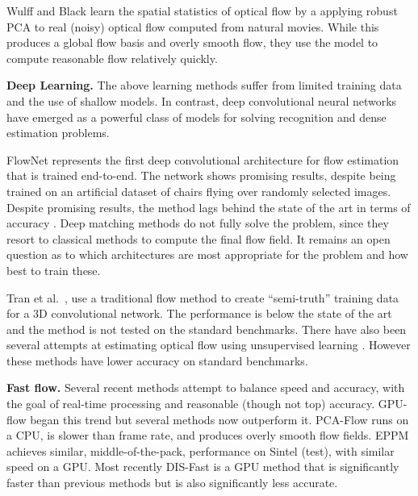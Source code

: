 \documentclass[10pt,twocolumn,letterpaper]{article}
\begin{document}
Wulff and Black \cite{wulff2015efficient} learn the spatial statistics of optical flow by a
applying robust PCA \cite{Hauberg:PAMI:2015} to real (noisy) optical flow computed from natural movies.
While this produces a global flow basis and overly smooth flow, 
they use the model to compute reasonable flow relatively quickly.






{\bf Deep Learning.} 
The above learning methods suffer from limited training data and the use of shallow models.
In contrast, deep convolutional neural networks have emerged as a powerful class of models for solving recognition \cite{he2015deep,szegedy2015going} and dense estimation \cite{chen2014semantic,long2015fully} problems. %


FlowNet \cite{dosovitskiy2015flownet} represents the first deep convolutional architecture for flow estimation that is trained end-to-end. 
The network shows promising results, despite being trained on an artificial dataset of chairs flying over randomly selected images.
Despite promising results, the method lags behind the state of the art in terms of accuracy \cite{dosovitskiy2015flownet}.  
Deep matching methods \cite{guney2016ACCV,epicflow,weinzaepfel2013deepflow,thewlis2016fully} do not fully solve the problem, since they resort to classical methods to compute the final flow field.
It remains an open question as to which architectures are most appropriate for the problem and how best to train these.



Tran et al.~\cite{Tran:End2End:2016}, use a traditional flow method to create ``semi-truth'' training data for a 3D convolutional network. 
The performance is below the state of the art and the method is not tested on the standard benchmarks.
There have also been several attempts at estimating optical flow using unsupervised learning \cite{ahmadi2016unsupervised,yu2016back}. 
However these methods have lower accuracy on standard benchmarks.







{\bf Fast flow.} Several recent methods attempt to balance speed and accuracy, with the goal of real-time processing and reasonable (though not top) accuracy.
GPU-flow \cite{Werlberger2009:GPUflow} began this trend but several methods now outperform it.
PCA-Flow \cite{wulff2015efficient} runs on a CPU, is slower than frame rate, and produces overly smooth flow fields.
EPPM \cite{bao2014tipeppm} achieves similar, middle-of-the-pack, performance on Sintel (test), with similar speed on a GPU.
Most recently DIS-Fast \cite{Kroeger:ECCV:2016} is a GPU method that is significantly faster than previous methods but is also significantly less accurate.
\end{document}
